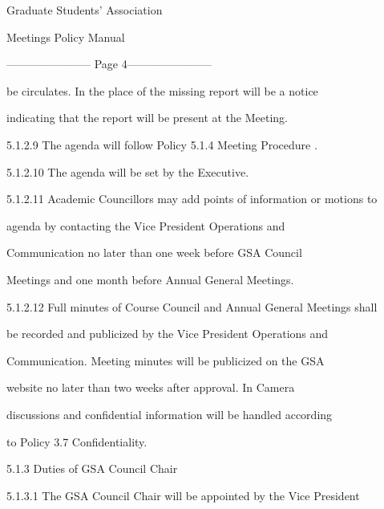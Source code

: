                                         

                                    Graduate Students’ Association  

                                        Meetings Policy Manual  

  


----------------------- Page 4-----------------------

            be  circulates.  In  the  place  of  the  missing  report  will  be  a  notice  

            indicating that the report will be present at the Meeting.   

  

5.1.2.9   The agenda will follow Policy 5.1.4 Meeting Procedure .   

  

5.1.2.10 The agenda will be set by the Executive.   

5.1.2.11 Academic Councillors may add points of information or motions to  

            agenda        by     contacting        the     Vice       President        Operations         and  

            Communication   no   later   than   one   week   before   GSA   Council  

            Meetings and one month before Annual General Meetings.   

  

5.1.2.12 Full minutes of Course Council and Annual General Meetings shall  

            be  recorded  and  publicized  by  the  Vice  President  Operations  and  

            Communication.  Meeting  minutes  will  be  publicized  on  the  GSA  

            website   no   later   than   two   weeks   after   approval.   In   Camera  

            discussions and confidential information will be handled according  

            to Policy 3.7 Confidentiality.  

           



                            5.1.3        Duties of GSA Council Chair  

  

5.1.3.1   The  GSA  Council  Chair  will  be  appointed  by  the  Vice  President  

